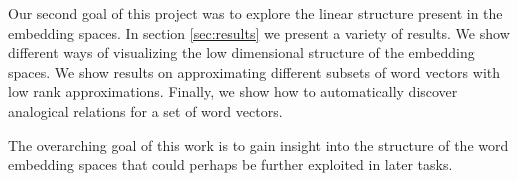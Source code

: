 Our second goal of this project was to explore the linear structure present in the embedding spaces. In section \ref{sec:results} we present a variety of results. We show different ways of visualizing the low dimensional structure of the embedding spaces. We show results on approximating different subsets of word vectors with low rank approximations. Finally, we show how to automatically discover analogical relations for a set of word vectors. 

The overarching goal of this work is to gain insight into the structure of the word embedding spaces that could perhaps be further exploited in later tasks. 
